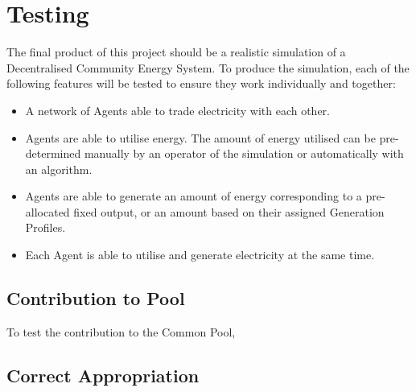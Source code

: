 \chapter{Testing}
\label{Testing}

The final product of this project should be a realistic simulation of a Decentralised Community Energy System. To produce the simulation, each of the following features will be tested to ensure they work individually and together:

\begin{itemize}
\item A network of Agents able to trade electricity with each other.
\item Agents are able to utilise energy. The amount of energy utilised can be pre-determined manually by an operator of the simulation or automatically with an algorithm.
\item Agents are able to generate an amount of energy corresponding to a pre-allocated fixed output, or an amount based on their assigned Generation Profiles.
\item Each Agent is able to utilise and generate electricity at the same time.
\end{itemize}


\section{Contribution to Pool} %
To test the contribution to the Common Pool, 

\section{Correct Appropriation}


